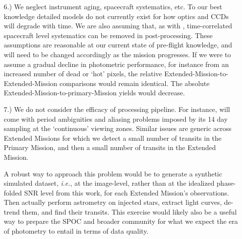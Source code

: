 \begin{itemize}
	
	\item [6.) We neglect instrument aging, spacecraft systematics, etc.]
	To our best knowledge detailed models do not currently exist for how \tesss optics and CCDs will degrade with time.
	We are also assuming that, as with \ktwo\!, time-correlated spacecraft level systematics can be removed in post-processing.
	These assumptions are reasonable at our current state of pre-flight knowledge, and will need to be changed accordingly as the mission progresses.
	If we were to assume a gradual decline in photometric performance, for instance from an increased number of dead or `hot' pixels, the relative Extended-Mission-to-Extended-Mission comparisons would remain identical.
	The absolute Extended-Mission-to-primary-Mission yields would decrease.
	
	\item [7.) We do not consider the efficacy of processing pipeline.]
	For instance, \hemis\:will come with period ambiguities and aliasing problems imposed by its 14 day sampling at the `continuous' viewing zones.
	Similar issues are generic across Extended Missions for which we detect a small number of transits in the Primary Mission, and then a small number of transits in the Extended Mission.
	
	A robust way to approach this problem would be to generate a synthetic simulated \tess dataset, \textit{i.e.}, at the image-level, rather than at the idealized phase-folded SNR level from this work, for each Extended Mission's observations.
	Then actually perform astrometry on injected stars, extract light curves, de-trend them, and find their transits.
	This exercise would likely also be a useful way to prepare the SPOC and broader community for what we expect the era of \tess photometry to entail in terms of data quality.	
\end{itemize}


